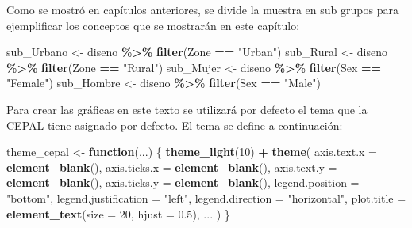 \documentclass[
  spanish,
  12pt,
]{book}
\newenvironment{Shaded}{\begin{snugshade}}{\end{snugshade}}
\newcommand{\AttributeTok}[1]{\textcolor[rgb]{0.13,0.29,0.53}{#1}}
\newcommand{\ControlFlowTok}[1]{\textcolor[rgb]{0.13,0.29,0.53}{\textbf{#1}}}
\newcommand{\DecValTok}[1]{\textcolor[rgb]{0.00,0.00,0.81}{#1}}
\newcommand{\FloatTok}[1]{\textcolor[rgb]{0.00,0.00,0.81}{#1}}
\newcommand{\FunctionTok}[1]{\textcolor[rgb]{0.13,0.29,0.53}{\textbf{#1}}}
\newcommand{\NormalTok}[1]{#1}
\newcommand{\OtherTok}[1]{\textcolor[rgb]{0.56,0.35,0.01}{#1}}
\newcommand{\SpecialCharTok}[1]{\textcolor[rgb]{0.81,0.36,0.00}{\textbf{#1}}}
\newcommand{\StringTok}[1]{\textcolor[rgb]{0.31,0.60,0.02}{#1}}
\begin{document}
Como se mostró en capítulos anteriores, se divide la muestra en sub grupos para ejemplificar los conceptos que se mostrarán en este capítulo:

\begin{Shaded}
\begin{Highlighting}[]
\NormalTok{sub\_Urbano }\OtherTok{\textless{}{-}}\NormalTok{ diseno }\SpecialCharTok{\%\textgreater{}\%} \FunctionTok{filter}\NormalTok{(Zone }\SpecialCharTok{==} \StringTok{"Urban"}\NormalTok{)}
\NormalTok{sub\_Rural }\OtherTok{\textless{}{-}}\NormalTok{ diseno }\SpecialCharTok{\%\textgreater{}\%} \FunctionTok{filter}\NormalTok{(Zone }\SpecialCharTok{==} \StringTok{"Rural"}\NormalTok{)}
\NormalTok{sub\_Mujer }\OtherTok{\textless{}{-}}\NormalTok{ diseno }\SpecialCharTok{\%\textgreater{}\%} \FunctionTok{filter}\NormalTok{(Sex }\SpecialCharTok{==} \StringTok{"Female"}\NormalTok{)}
\NormalTok{sub\_Hombre }\OtherTok{\textless{}{-}}\NormalTok{ diseno }\SpecialCharTok{\%\textgreater{}\%} \FunctionTok{filter}\NormalTok{(Sex }\SpecialCharTok{==} \StringTok{"Male"}\NormalTok{)}
\end{Highlighting}
\end{Shaded}

Para crear las gráficas en este texto se utilizará por defecto el tema que la CEPAL tiene asignado por defecto. El tema se define a continuación:

\begin{Shaded}
\begin{Highlighting}[]
\NormalTok{theme\_cepal }\OtherTok{\textless{}{-}} \ControlFlowTok{function}\NormalTok{(...) \{}
  \FunctionTok{theme\_light}\NormalTok{(}\DecValTok{10}\NormalTok{) }\SpecialCharTok{+}
    \FunctionTok{theme}\NormalTok{(}
      \AttributeTok{axis.text.x =} \FunctionTok{element\_blank}\NormalTok{(),}
      \AttributeTok{axis.ticks.x =} \FunctionTok{element\_blank}\NormalTok{(),}
      \AttributeTok{axis.text.y =} \FunctionTok{element\_blank}\NormalTok{(),}
      \AttributeTok{axis.ticks.y =} \FunctionTok{element\_blank}\NormalTok{(),}
      \AttributeTok{legend.position =} \StringTok{"bottom"}\NormalTok{,}
      \AttributeTok{legend.justification =} \StringTok{"left"}\NormalTok{,}
      \AttributeTok{legend.direction =} \StringTok{"horizontal"}\NormalTok{,}
      \AttributeTok{plot.title =} \FunctionTok{element\_text}\NormalTok{(}\AttributeTok{size =} \DecValTok{20}\NormalTok{, }\AttributeTok{hjust =} \FloatTok{0.5}\NormalTok{),}
\NormalTok{      ...}
\NormalTok{    )}
\NormalTok{\}}
\end{Highlighting}
\end{Shaded}
\end{document}
